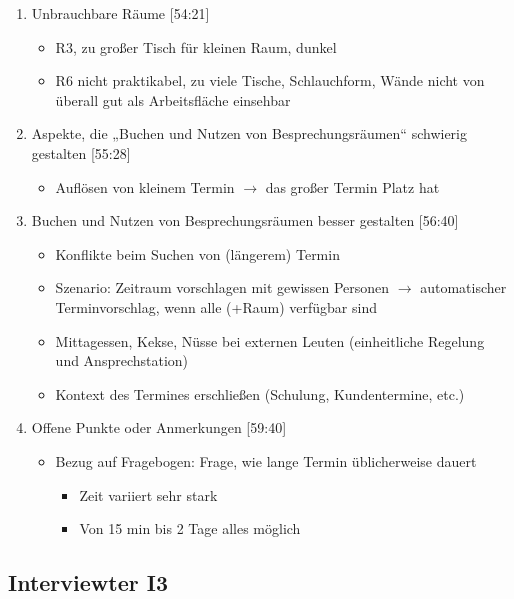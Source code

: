 \begin{enumerate}
    \item Unbrauchbare Räume [54:21]
     \begin{itemize}
        \item R3, zu großer Tisch für kleinen Raum, dunkel
        \item R6 nicht praktikabel, zu viele Tische, Schlauchform, Wände nicht von überall gut als Arbeitsfläche einsehbar
    \end{itemize}
        
    \item Aspekte, die „Buchen und Nutzen von Besprechungsräumen“ schwierig gestalten [55:28]
     \begin{itemize}
        \item Auflösen von kleinem Termin $\rightarrow$ das großer Termin Platz hat
    \end{itemize}

    \item Buchen und Nutzen von Besprechungsräumen besser gestalten [56:40]
     \begin{itemize}
        \item Konflikte beim Suchen von (längerem) Termin
        \item Szenario: Zeitraum vorschlagen mit gewissen Personen $\rightarrow$ automatischer Terminvorschlag, wenn alle (+Raum) verfügbar sind
        \item Mittagessen, Kekse, Nüsse bei externen Leuten (einheitliche Regelung und Ansprechstation)
        \item Kontext des Termines erschließen (Schulung, Kundentermine, etc.)
    \end{itemize}
        
    \item Offene Punkte oder Anmerkungen [59:40]
     \begin{itemize}
        \item Bezug auf Fragebogen: Frage, wie lange Termin üblicherweise dauert
        \begin{itemize}
            \item Zeit variiert sehr stark 
            \item Von 15 min bis 2 Tage alles möglich
        \end{itemize}
    \end{itemize}

\end{enumerate}

\subsection{Interviewter I3}
\label{subsec:interview-i3}

